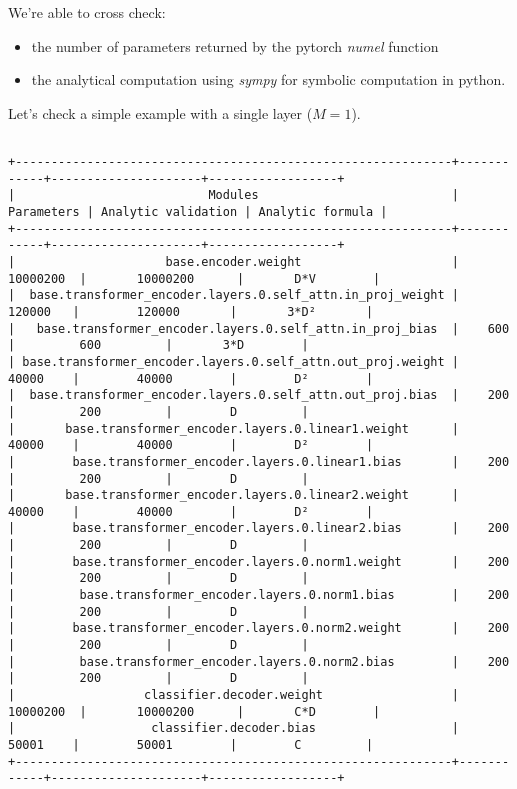 \documentclass[a4paper]{article}
\begin{document}
We're able to cross check:
\begin{itemize}
    \item the number of parameters returned by the pytorch \textit{numel} function
    \item the analytical computation using \textit{sympy} for symbolic computation in python.
\end{itemize}
Let's check a simple example with a single layer ($M=1$).
\begin{tiny}
\begin{verbatim}

+-------------------------------------------------------------+------------+---------------------+------------------+
|                           Modules                           | Parameters | Analytic validation | Analytic formula |
+-------------------------------------------------------------+------------+---------------------+------------------+
|                     base.encoder.weight                     |  10000200  |       10000200      |       D*V        |
|  base.transformer_encoder.layers.0.self_attn.in_proj_weight |   120000   |        120000       |       3*D²       |
|   base.transformer_encoder.layers.0.self_attn.in_proj_bias  |    600     |         600         |       3*D        |
| base.transformer_encoder.layers.0.self_attn.out_proj.weight |   40000    |        40000        |        D²        |
|  base.transformer_encoder.layers.0.self_attn.out_proj.bias  |    200     |         200         |        D         |
|       base.transformer_encoder.layers.0.linear1.weight      |   40000    |        40000        |        D²        |
|        base.transformer_encoder.layers.0.linear1.bias       |    200     |         200         |        D         |
|       base.transformer_encoder.layers.0.linear2.weight      |   40000    |        40000        |        D²        |
|        base.transformer_encoder.layers.0.linear2.bias       |    200     |         200         |        D         |
|        base.transformer_encoder.layers.0.norm1.weight       |    200     |         200         |        D         |
|         base.transformer_encoder.layers.0.norm1.bias        |    200     |         200         |        D         |
|        base.transformer_encoder.layers.0.norm2.weight       |    200     |         200         |        D         |
|         base.transformer_encoder.layers.0.norm2.bias        |    200     |         200         |        D         |
|                  classifier.decoder.weight                  |  10000200  |       10000200      |       C*D        |
|                   classifier.decoder.bias                   |   50001    |        50001        |        C         |
+-------------------------------------------------------------+------------+---------------------+------------------+
\end{verbatim}
\end{tiny}
\end{document}

